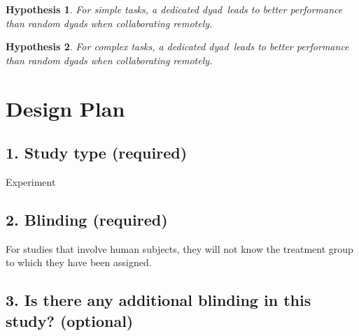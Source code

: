 \documentclass[A4,11pt]{article}
\renewcommand{\~}[1]{\tilde{#1}}
\renewcommand{\-}[1]{\overline{#1}}
\newtheorem{hypothesis}{Hypothesis}
\newcommand{\dyad}{dyad}
\begin{document}
\begin{hypothesis}\label{h:remote_simple}
For simple tasks, a dedicated \dyad\ leads to better performance than random \dyad s when collaborating remotely.
\end{hypothesis}

\begin{hypothesis}\label{h:remote_complex}
For complex tasks, a dedicated \dyad\ leads to better performance than random \dyad s when collaborating remotely.
\end{hypothesis}

\newpage

\section*{Design Plan}


\subsection*{1. Study type (required) }
Experiment

\subsection*{2. Blinding (required) }
For studies that involve human subjects, they will not know the treatment group to which they have been assigned.




\subsection*{3. Is there any additional blinding in this study? (optional)}
\end{document}
